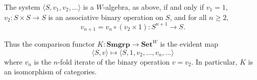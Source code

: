 The system $\langle S, v_1, v_2, \ldots \rangle$ is a $W$-algebra, as above, if and only if $v_1 = 1$, $v_2 : S \times S \to S$ is an associative binary operation on $S$, and for all $n \geq 2$,
$$v_{n+1} = v_n \circ (v_2 \times 1) : S^{n+1} \to S.$$

Thus the comparison functor $K : \mathbf{Smgrp} \to \mathbf{Set}^W$ is the evident map
$$\langle S, v \rangle \mapsto \langle S, 1, v_2, \ldots, v_n, \ldots \rangle$$
where $v_n$ is the $n$-fold iterate of the binary operation $v = v_2$. In particular, $K$ is an isomorphism of categories.
